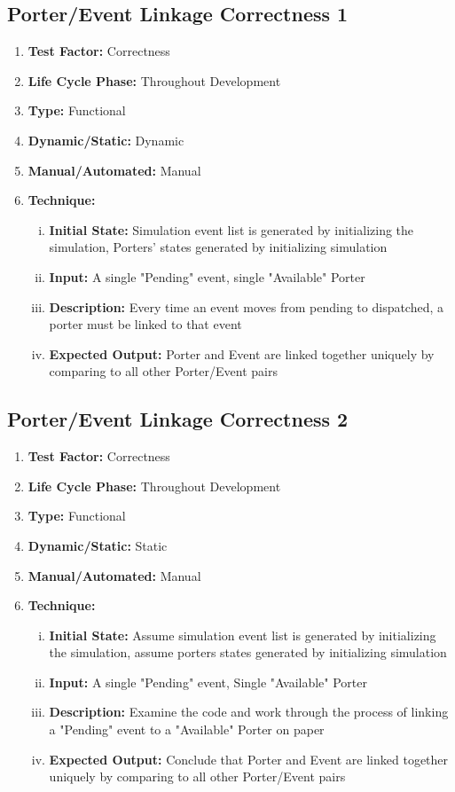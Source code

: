 \documentclass[paper=letter, fontsize=10pt]{scrartcl}
\numberwithin{equation}{section}		%
\numberwithin{figure}{section}			%
\numberwithin{table}{section}				%
\begin{document}
\subsection{Porter/Event Linkage Correctness 1}
\begin{enumerate}[] 	
	\item \textbf{Test Factor:} Correctness 
	\item \textbf{Life Cycle Phase:} Throughout Development
	\item \textbf{Type:} Functional
	\item \textbf{Dynamic/Static:} Dynamic
	\item \textbf{Manual/Automated:} Manual
	\item \textbf{Technique:}
		\begin{enumerate}[(i)]
			\item \textbf{Initial State:} Simulation event list is generated by initializing the simulation, Porters' states generated by initializing simulation
			\item \textbf{Input:} A single "Pending" event, single "Available" Porter
			\item \textbf{Description:} Every time an event moves from pending to dispatched, a porter must be linked to that event
			\item \textbf{Expected Output:} Porter and Event are linked together uniquely by comparing to all other Porter/Event pairs
		\end{enumerate}
\end{enumerate}

\subsection{Porter/Event Linkage Correctness 2}
\begin{enumerate}[] 	
	\item \textbf{Test Factor:} Correctness 
	\item \textbf{Life Cycle Phase:} Throughout Development
	\item \textbf{Type:} Functional
	\item \textbf{Dynamic/Static:} Static
	\item \textbf{Manual/Automated:} Manual
	\item \textbf{Technique:}
		\begin{enumerate}[(i)]
			\item \textbf{Initial State:} Assume simulation event list is generated by initializing the simulation, assume porters states generated by initializing simulation
			\item \textbf{Input:} A single "Pending" event, Single "Available" Porter
			\item \textbf{Description:} Examine the code and work through the process of linking a "Pending" event to a "Available" Porter on paper
			\item \textbf{Expected Output:} Conclude that Porter and Event are linked together uniquely by comparing to all other Porter/Event pairs
		\end{enumerate}
\end{enumerate}
\end{document}
